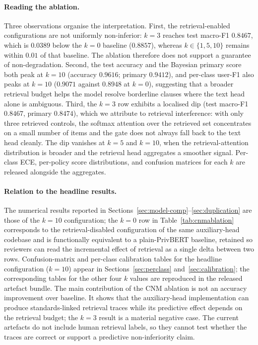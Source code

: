 \documentclass[final,3p,times,twocolumn]{elsarticle}
\begin{document}
	\paragraph{Reading the ablation.}
	Three observations organise the interpretation. First, the retrieval-enabled
	configurations are not uniformly non-inferior: $k=3$ reaches test macro-F1
	$0.8467$, which is $0.0389$ below the $k=0$ baseline ($0.8857$), whereas
	$k\in\{1,5,10\}$ remains within $0.01$ of that baseline. The ablation therefore
	does not support a guarantee of non-degradation. Second, the test accuracy and the Bayesian primary
	score both peak at $k = 10$ (accuracy $0.9616$; primary $0.9412$), and per-class
	user-F1 also peaks at $k = 10$ ($0.9071$ against $0.8948$ at $k = 0$), suggesting
	that a broader retrieval budget helps the model resolve borderline clauses where
	the text head alone is ambiguous. Third, the $k = 3$ row exhibits a localised dip
	(test macro-F1 $0.8467$, primary $0.8474$), which we attribute to retrieval interference:
	with only three retrieved controls, the softmax attention over the retrieved set
	concentrates on a small number of items and the gate does not always fall back
	to the text head cleanly. The dip vanishes at $k = 5$ and $k = 10$, when the retrieval-attention
	distribution is broader and the retrieval head aggregates a smoother signal.
	Per-class ECE, per-policy score distributions, and confusion matrices for each
	$k$ are released alongside the aggregates.

	\paragraph{Relation to the headline results.}
	The numerical results reported in Sections~\ref{sec:model-comp}--\ref{sec:duplication}
	are those of the $k = 10$ configuration; the $k = 0$ row in Table~\ref{tab:cnmablation}
	corresponds to the retrieval-disabled configuration of the same auxiliary-head
	codebase and is functionally equivalent to a plain-PrivBERT baseline, retained
	so reviewers can read the incremental effect of retrieval as a single delta
	between two rows. Confusion-matrix and per-class calibration tables for the headline
	configuration ($k = 10$) appear in Sections~\ref{sec:perclass} and~\ref{sec:calibration};
	the corresponding tables for the other four $k$ values are reproduced in the
	released artefact bundle. The main contribution of the CNM ablation is not an
	accuracy improvement over baseline. It shows that the auxiliary-head
	implementation can produce standards-linked retrieval traces while its predictive
	effect depends on the retrieval budget; the $k=3$ result is a material negative
	case. The current artefacts do not include human retrieval labels, so they cannot
	test whether the traces are correct or support a predictive non-inferiority claim.
	
\end{document}

